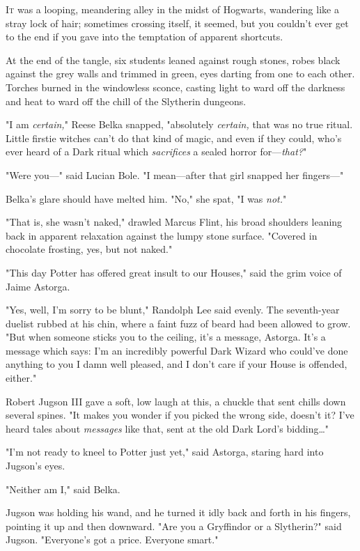 
\lettrine{I}{t} was a looping,
meandering alley in the midst of Hogwarts, wandering like a stray lock of hair;
sometimes crossing itself, it seemed, but you couldn't ever get to the end if
you gave into the temptation of apparent shortcuts.

At the end of the tangle, six students leaned against rough stones, robes black
against the grey walls and trimmed in green, eyes darting from one to each
other. Torches burned in the windowless sconce, casting light to ward off the
darkness and heat to ward off the chill of the Slytherin dungeons.

"I am \emph{certain,}" Reese Belka snapped, "absolutely \emph{certain,} that
was no true ritual. Little firstie witches can't do that kind of magic, and
even if they could, who's ever heard of a Dark ritual which \emph{sacrifices} a
sealed horror for—\emph{that?}"

"Were you—" said Lucian Bole. "I mean—after that girl snapped her
fingers—"

Belka's glare should have melted him. "No," she spat, "I was \emph{not.}"

"That is, she wasn't naked," drawled Marcus Flint, his broad shoulders leaning
back in apparent relaxation against the lumpy stone surface. "Covered in
chocolate frosting, yes, but not naked."

"This day Potter has offered great insult to our Houses," said the grim voice
of Jaime Astorga.

"Yes, well, I'm sorry to be blunt," Randolph Lee said evenly. The seventh-year
duelist rubbed at his chin, where a faint fuzz of beard had been allowed to
grow. "But when someone sticks you to the ceiling, it's a message, Astorga.
It's a message which says: I'm an incredibly powerful Dark Wizard who could've
done anything to you I damn well pleased, and I don't care if your House is
offended, either."

Robert Jugson III gave a soft, low laugh at this, a chuckle that sent chills
down several spines. "It makes you wonder if you picked the wrong side, doesn't
it? I've heard tales about \emph{messages} like that, sent at the old Dark
Lord's bidding…"

"I'm not ready to kneel to Potter just yet," said Astorga, staring hard into
Jugson's eyes.

"Neither am I," said Belka.

Jugson was holding his wand, and he turned it idly back and forth in his
fingers, pointing it up and then downward. "Are you a Gryffindor or a
Slytherin?" said Jugson. "Everyone's got a price. Everyone smart."

